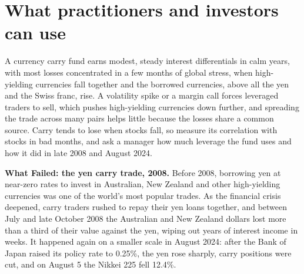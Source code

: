 \section{What practitioners and investors can use}
\label{sec:06-investors}

A currency carry fund earns modest, steady interest differentials in calm years, with most losses concentrated in a few months of global stress, when high-yielding currencies fall together and the borrowed currencies, above all the yen and the Swiss franc, rise. A volatility spike or a margin call forces leveraged traders to sell, which pushes high-yielding currencies down further, and spreading the trade across many pairs helps little because the losses share a common source. Carry tends to lose when stocks fall, so measure its correlation with stocks in bad months, and ask a manager how much leverage the fund uses and how it did in late 2008 and August 2024.

\begin{callout}
\textbf{What Failed: the yen carry trade, 2008.} Before 2008, borrowing yen at near-zero rates to invest in Australian, New Zealand and other high-yielding currencies was one of the world's most popular trades. As the financial crisis deepened, carry traders rushed to repay their yen loans together, and between July and late October 2008 the Australian and New Zealand dollars lost more than a third of their value against the yen, wiping out years of interest income in weeks. It happened again on a smaller scale in August 2024: after the Bank of Japan raised its policy rate to 0.25\%, the yen rose sharply, carry positions were cut, and on August 5 the Nikkei 225 fell 12.4\%.
\end{callout}

\makeatletter
{}
\makeatother

